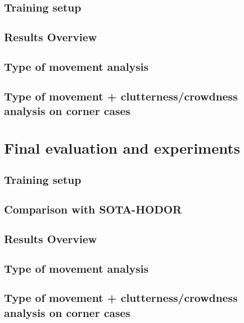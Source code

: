 \subsection{Training setup}

\subsection{Results Overview}

\subsection{Type of movement analysis}
\subsection{Type of movement + clutterness/crowdness analysis on corner cases}
\section{Final evaluation and experiments}
\subsection{Training setup}

\subsection{Comparison with SOTA-HODOR}
\subsection{Results Overview}

\subsection{Type of movement analysis}
\subsection{Type of movement + clutterness/crowdness analysis on corner cases}
